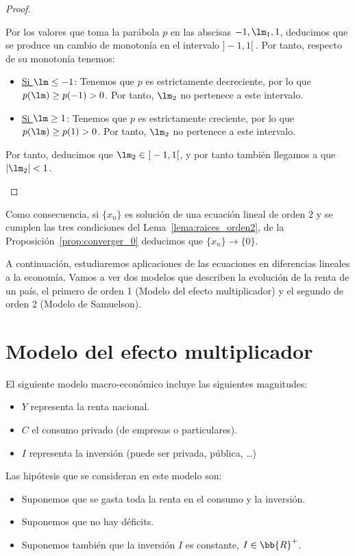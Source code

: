 \begin{lema}
\begin{proof}
\begin{description}
\begin{itemize}
            Por los valores que toma la parábola $p$ en las abscisas $-1,\lm_1,1$, deducimos que se produce un cambio de monotonía en el intervalo $]-1,1[~$. Por tanto, respecto de su monotonía tenemos:
            \begin{itemize}
                \item \ul{Si $\lm\leq -1$}: Tenemos que $p$ es estrictamente decreciente, por lo que $p(\lm)\geq p(-1)>0$. Por tanto, $\lm_2$ no pertenece a este intervalo.
                \item \ul{Si $\lm\geq 1$}: Tenemos que $p$ es estrictamente creciente, por lo que $p(\lm)\geq p(1)>0$. Por tanto, $\lm_2$ no pertenece a este intervalo.
            \end{itemize}
            Por tanto, deducimos que $\lm_2\in~]-1,1[$, y por tanto también llegamos a que $|\lm_2|<1$.
        \end{itemize}
    \end{description}
\end{proof}
\end{lema}

\begin{coro}
    Como consecuencia, si $\{x_n\}$ es solución de una ecuación lineal de orden $2$ y se cumplen las tres condiciones del Lema~\ref{lema:raices_orden2}, de la Proposición~\ref{prop:converger_0} deducimos que $\{x_n\} \rightarrow \{0\}$.
\end{coro}

A continuación, estudiaremos aplicaciones de las ecuaciones en diferencias lineales a la economía. Vamos a ver dos modelos que describen la evolución de la renta de un país, el primero de orden 1 (Modelo del efecto multiplicador) y el segundo de orden 2 (Modelo de Samuelson).
\section{Modelo del efecto multiplicador}
El siguiente modelo macro-económico incluye las siguientes magnitudes:
\begin{itemize}
    \item $Y$ representa la renta nacional.
    \item $C$ el consumo privado (de empresas o particulares).
    \item $I$ representa la inversión (puede ser privada, pública, \ldots)
\end{itemize}
Las hipótesis que se consideran en este modelo son:
\begin{itemize}
    \item Suponemos que se gasta toda la renta en el consumo y la inversión.
    \item Suponemos que no hay déficits.
    \item Suponemos también que la inversión $I$ es constante, $I\in \bb{R}^+$.
\end{itemize}


